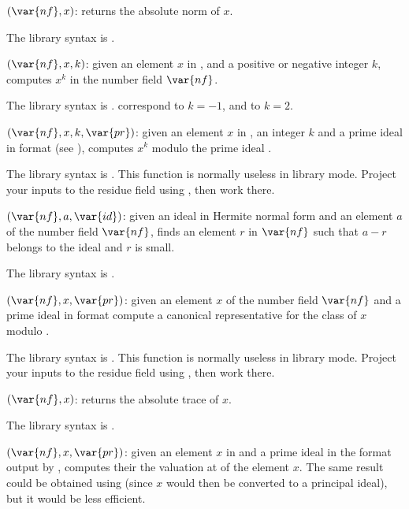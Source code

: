 $(\var{nf},x)$: \label{se:nfeltnorm}returns the absolute norm of $x$.

The library syntax is .

$(\var{nf},x,k)$: \label{se:nfeltpow}given an element $x$ in , and a positive or negative integer $k$,
computes $x^k$ in the number field $\var{nf}$.

The library syntax is .
 correspond to $k = -1$, and
 to $k = 2$.

$(\var{nf},x,k,\var{pr})$: \label{se:nfeltpowmodpr}given an element $x$ in , an integer $k$ and a prime ideal
 in  format
(see ), computes $x^k$ modulo the prime ideal .

The library syntax is .
This function is normally useless in library mode. Project your
inputs to the residue field using , then work there.

$(\var{nf},a,\var{id})$: \label{se:nfeltreduce}given an ideal  in
Hermite normal form and an element $a$ of the number field $\var{nf}$,
finds an element $r$ in $\var{nf}$ such that $a-r$ belongs to the ideal
and $r$ is small.

The library syntax is .

$(\var{nf},x,\var{pr})$: \label{se:nfeltreducemodpr}given an element $x$ of the number field $\var{nf}$ and a prime ideal
 in  format compute a canonical representative for the
class of $x$ modulo .

The library syntax is .
This function is normally useless in library mode. Project your
inputs to the residue field using , then work there.

$(\var{nf},x)$: \label{se:nfelttrace}returns the absolute trace of $x$.

The library syntax is .

$(\var{nf},x,\var{pr})$: \label{se:nfeltval}given an element $x$ in
 and a prime ideal  in the format output by
, computes their the valuation at  of the
element $x$. The same result could be obtained using
 (since $x$ would then be converted to a
principal ideal), but it would be less efficient.

